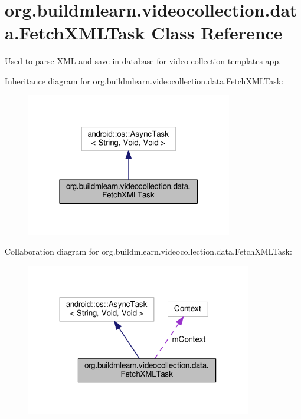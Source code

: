 \hypertarget{classorg_1_1buildmlearn_1_1videocollection_1_1data_1_1FetchXMLTask}{}\section{org.\+buildmlearn.\+videocollection.\+data.\+Fetch\+X\+M\+L\+Task Class Reference}
\label{classorg_1_1buildmlearn_1_1videocollection_1_1data_1_1FetchXMLTask}


Used to parse X\+ML and save in database for video collection template\textquotesingle{}s app.  




Inheritance diagram for org.\+buildmlearn.\+videocollection.\+data.\+Fetch\+X\+M\+L\+Task\+:
\nopagebreak
\begin{figure}[H]
\begin{center}
\leavevmode
\includegraphics[width=255pt]{classorg_1_1buildmlearn_1_1videocollection_1_1data_1_1FetchXMLTask__inherit__graph}
\end{center}
\end{figure}


Collaboration diagram for org.\+buildmlearn.\+videocollection.\+data.\+Fetch\+X\+M\+L\+Task\+:
\nopagebreak
\begin{figure}[H]
\begin{center}
\leavevmode
\includegraphics[width=279pt]{classorg_1_1buildmlearn_1_1videocollection_1_1data_1_1FetchXMLTask__coll__graph}
\end{center}
\end{figure}
